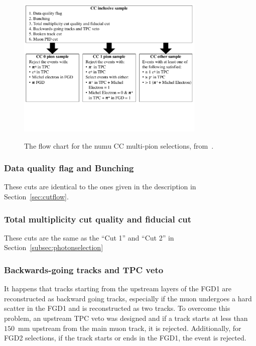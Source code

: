 \begin{figure}[ht]
  \center
  \includegraphics[width=0.8\textwidth]{images/BANFF/FlowCharSelection.pdf} \\
  \caption[The flow chart for the $\nu_\mu$ CC multi-pion
  selections]{The flow chart for the \Gls{numu} \Gls{CC} multi-pion
    selections, from~\cite{TN152}.}
  \label{fig:flowchart}
\end{figure}


\subsubsection{Data quality flag and Bunching}
These cuts are identical to the ones given in the description in
Section~\ref{sec:cutflow}.

\subsubsection{Total multiplicity cut quality and fiducial cut}
These cuts are the same as the ``Cut 1'' and ``Cut 2'' in
Section~\ref{subsec:photonselection}

\subsubsection{Backwards-going tracks and TPC veto}
It happens that tracks starting from the upstream layers of the
\Gls{FGD}1 are reconstructed as backward going tracks, especially if
the muon undergoes a hard scatter in the \Gls{FGD}1 and is
reconstructed as two tracks. To overcome this problem, an upstream
\Gls{TPC} veto was designed and if a track starts at less than
$150$~mm upstream from the main muon track, it is
rejected. Additionally, for \Gls{FGD}2 selections, if the track starts
or ends in the \Gls{FGD}1, the event is rejected.

